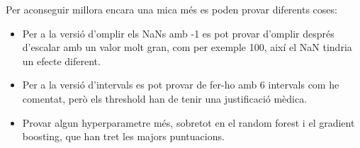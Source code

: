 \documentclass[9pt,a4paper,twoside]{tau-class/tau}
\begin{document}
    Per aconseguir millora encara una mica més es poden provar diferents coses:
    \begin{itemize}
        \item Per a la versió d'omplir els NaNs amb -1 es pot provar d'omplir després d'escalar amb un valor molt gran, com per exemple 100, així el NaN tindria un efecte diferent.
        \item Per a la versió d'intervals es pot provar de fer-ho amb 6 intervals com he comentat, però els threshold han de tenir una justificació mèdica.
        \item Provar algun hyperparametre més, sobretot en el random forest i el gradient boosting, que han tret les majors puntuacions.
    \end{itemize}

    

\printbibliography

\end{document}
